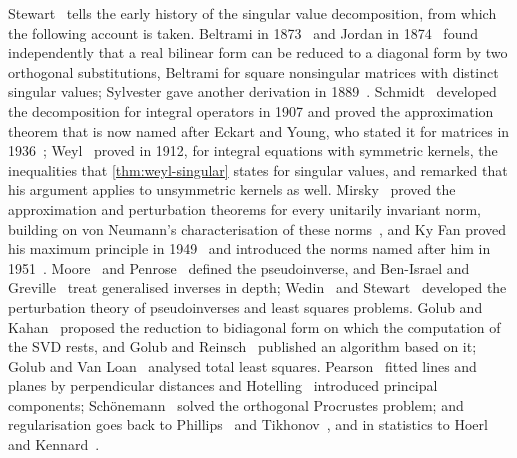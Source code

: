 Stewart~\cite{stewart1993} tells the early history of the singular value decomposition, from which the following account is taken. Beltrami in 1873~\cite{beltrami1873} and Jordan in 1874~\cite{jordan1874} found independently that a real bilinear form can be reduced to a diagonal form by two orthogonal substitutions, Beltrami for square nonsingular matrices with distinct singular values; Sylvester gave another derivation in 1889~\cite{sylvester1889}. Schmidt~\cite{schmidt1907} developed the decomposition for integral operators in 1907 and proved the approximation theorem that is now named after Eckart and Young, who stated it for matrices in 1936~\cite{eckart1936}; Weyl~\cite{weyl1912} proved in 1912, for integral equations with symmetric kernels, the inequalities that \cref{thm:weyl-singular} states for singular values, and remarked that his argument applies to unsymmetric kernels as well. Mirsky~\cite{mirsky1960} proved the approximation and perturbation theorems for every unitarily invariant norm, building on von Neumann's characterisation of these norms~\cite{vonneumann1937}, and Ky Fan proved his maximum principle in 1949~\cite{fan1949} and introduced the norms named after him in 1951~\cite{fan1951}. Moore~\cite{moore1920} and Penrose~\cite{penrose1955} defined the pseudoinverse, and Ben-Israel and Greville~\cite{bengreville2003} treat generalised inverses in depth; Wedin~\cite{wedin1973} and Stewart~\cite{stewart1977} developed the perturbation theory of pseudoinverses and least squares problems. Golub and Kahan~\cite{golubkahan1965} proposed the reduction to bidiagonal form on which the computation of the SVD rests, and Golub and Reinsch~\cite{golubreinsch1970} published an algorithm based on it; Golub and Van Loan~\cite{golubvanloan1980} analysed total least squares. Pearson~\cite{pearson1901} fitted lines and planes by perpendicular distances and Hotelling~\cite{hotelling1933} introduced principal components; Sch\"onemann~\cite{schonemann1966} solved the orthogonal Procrustes problem; and regularisation goes back to Phillips~\cite{phillips1962} and Tikhonov~\cite{tikhonov1963}, and in statistics to Hoerl and Kennard~\cite{hoerl1970}.

